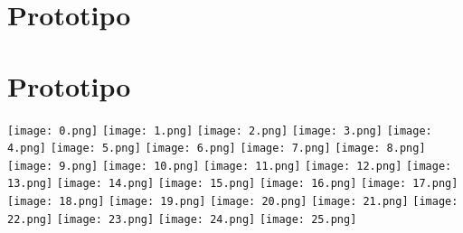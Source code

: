 \documentclass[11pt]{article}
\begin{document}
\section{Prototipo}
\section{Prototipo}
\texttt{[image: 0.png]}
\texttt{[image: 1.png]}
\texttt{[image: 2.png]}
\texttt{[image: 3.png]}
\texttt{[image: 4.png]}
\texttt{[image: 5.png]}
\texttt{[image: 6.png]}
\texttt{[image: 7.png]}
\texttt{[image: 8.png]}
\texttt{[image: 9.png]}
\texttt{[image: 10.png]}
\texttt{[image: 11.png]}
\texttt{[image: 12.png]}
\texttt{[image: 13.png]}
\texttt{[image: 14.png]}
\texttt{[image: 15.png]}
\texttt{[image: 16.png]}
\texttt{[image: 17.png]}
\texttt{[image: 18.png]}
\texttt{[image: 19.png]}
\texttt{[image: 20.png]}
\texttt{[image: 21.png]}
\texttt{[image: 22.png]}
\texttt{[image: 23.png]}
\texttt{[image: 24.png]}
\texttt{[image: 25.png]}
\end{document}
